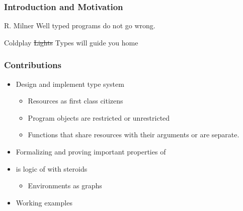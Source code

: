 \begin{frame}[c]
  \frametitle{Introduction and Motivation}
  \begin{center}
    \uncover<+-> {\LARGE
      \begin{aquote}{R. Milner}
        Well typed programs do not go wrong.
      \end{aquote}
    }
    \vspace{2cm}
    \uncover<+-> {\LARGE
      \begin{aquote}{Coldplay}
        \sout{Lights}{\color{red} Types} will guide you home
      \end{aquote}
    }
  \end{center}
\end{frame}

\begin{frame}
  \frametitle{Contributions}
  \begin{itemize}
  \item
    Design and implement \qub{} type system
      \begin{itemize}
      \item Resources as first class citizens
      \item Program objects are restricted or unrestricted
      \item Functions that share resources with their arguments or are separate.
      \end{itemize}
  \item Formalizing and proving important properties of \qub{}
  \item \qub{} is logic of \BI with steroids
    \begin{itemize}
    \item Environments as graphs
    \end{itemize}
  \item Working examples
  \end{itemize}
\end{frame}

